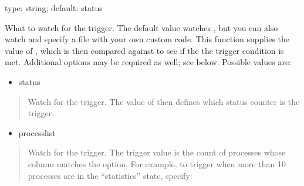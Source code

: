 \documentclass[letterpaper,10pt,english]{sphinxmanual}
\begin{document}
\begin{fulllineitems}
\label{\detokenize{mariadb-stat:cmdoption-mariadb-stat-function}}
type: string; default: status

What to watch for the trigger.  The default value watches
, but you can also watch  and specify
a file with your own custom code.  This function supplies the value of
{\hyperref[\detokenize{mariadb-stat:cmdoption-mariadb-stat-variable}]{}}, which is then compared against {\hyperref[\detokenize{mariadb-stat:cmdoption-mariadb-stat-threshold}]{}} to see if the
the trigger condition is met.  Additional options may be required as
well; see below. Possible values are:
\begin{itemize}
\item {} 
status

\end{itemize}
\begin{quote}

Watch  for the trigger.  The value of
{\hyperref[\detokenize{mariadb-stat:cmdoption-mariadb-stat-variable}]{}} then defines which status counter is the trigger.
\end{quote}
\begin{itemize}
\item {} 
processlist

\end{itemize}
\begin{quote}

Watch  for the trigger.  The trigger
value is the count of processes whose {\hyperref[\detokenize{mariadb-stat:cmdoption-mariadb-stat-variable}]{}} column matches the
{\hyperref[\detokenize{mariadb-stat:cmdoption-mariadb-stat-match}]{}} option.  For example, to trigger {\hyperref[\detokenize{mariadb-stat:cmdoption-mariadb-stat-collect}]{}} when more than
10 processes are in the “statistics” state, specify:


\end{quote}
\end{fulllineitems}
\end{document}
